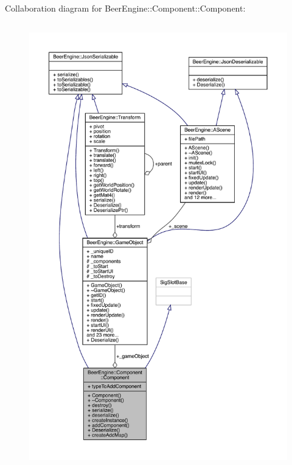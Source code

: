 Collaboration diagram for Beer\+Engine\+:\+:Component\+:\+:Component\+:
\nopagebreak
\begin{figure}[H]
\begin{center}
\leavevmode
\includegraphics[height=550pt]{class_beer_engine_1_1_component_1_1_component__coll__graph}
\end{center}
\end{figure}
